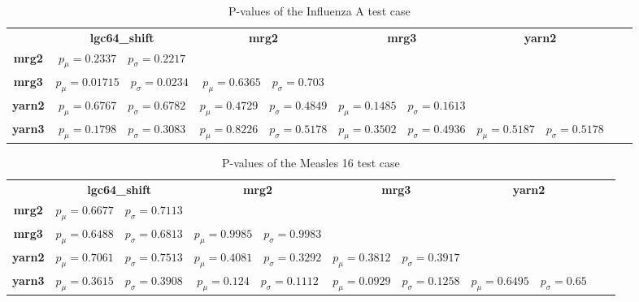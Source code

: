 \documentclass{acmart}
\begin{document}
\begin{table}[!hbt]
    \begin{tabular}{c|c|c|c|c|c|c}
        & \textbf{lgc64\_shift} & \textbf{mrg2} & \textbf{mrg3} & \textbf{yarn2} \\
        \textbf{mrg2}      
            & \(p_{\mu} = 0.2337 \quad p_{\sigma} = 0.2217 \) 
            & \cellcolor{gray}
            & \cellcolor{gray}
            & \cellcolor{gray} \\
        \textbf{mrg3}          
            & \(p_{\mu} = 0.01715 \quad p_{\sigma} = 0.0234 \)
            & \(p_{\mu} = 0.6365 \quad p_{\sigma} = 0.703 \) 
            & \cellcolor{gray} 
            & \cellcolor{gray} \\
        \textbf{yarn2}        
            & \(p_{\mu} = 0.6767 \quad p_{\sigma} = 0.6782 \)  
            & \(p_{\mu} = 0.4729 \quad p_{\sigma} = 0.4849 \)  
            & \(p_{\mu} = 0.1485 \quad p_{\sigma} = 0.1613  \)  
            & \cellcolor{gray} \\
        \textbf{yarn3}          
            & \(p_{\mu} = 0.1798 \quad p_{\sigma} = 0.3083 \)  
            & \(p_{\mu} = 0.8226 \quad p_{\sigma} = 0.5178  \) 
            & \(p_{\mu} = 0.3502 \quad p_{\sigma} = 0.4936  \)
            & \(p_{\mu} = 0.5187 \quad p_{\sigma} = 0.5178  \) \\
    \end{tabular}
    \caption{P-values of the Influenza A test case}
    \label{tab:measles_16:p_values}
\end{table}


\begin{table}[!hbt]
    \begin{tabular}{c|c|c|c|c|c|c}
        & \textbf{lgc64\_shift} & \textbf{mrg2} & \textbf{mrg3} & \textbf{yarn2} \\
        \textbf{mrg2}      
            & \(p_{\mu} = 0.6677 \quad p_{\sigma} = 0.7113 \) 
            & \cellcolor{gray}
            & \cellcolor{gray}
            & \cellcolor{gray} \\
        \textbf{mrg3}          
            & \(p_{\mu} = 0.6488 \quad p_{\sigma} = 0.6813 \)
            & \(p_{\mu} = 0.9985 \quad p_{\sigma} = 0.9983 \) 
            & \cellcolor{gray} 
            & \cellcolor{gray} \\
        \textbf{yarn2}        
            & \(p_{\mu} = 0.7061 \quad p_{\sigma} = 0.7513 \)  
            & \(p_{\mu} = 0.4081 \quad p_{\sigma} = 0.3292 \)  
            & \(p_{\mu} = 0.3812  \quad p_{\sigma} = 0.3917  \)  
            & \cellcolor{gray} \\
        \textbf{yarn3}          
            & \(p_{\mu} = 0.3615 \quad p_{\sigma} = 0.3908  \)  
            & \(p_{\mu} = 0.124 \quad p_{\sigma} = 0.1112  \) 
            & \(p_{\mu} = 0.0929 \quad p_{\sigma} = 0.1258  \)
            & \(p_{\mu} = 0.6495 \quad p_{\sigma} = 0.65  \) \\
    \end{tabular}
    \caption{P-values of the Measles 16 test case}
    \label{tab:measles_16:p_values}
\end{table}
\end{document}
